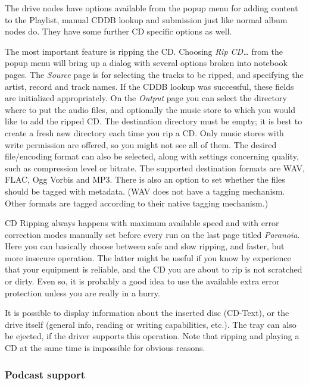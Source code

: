 \documentclass[10pt,english]{article}
\begin{document}
The drive nodes have options available from the popup
menu for adding content to the Playlist, manual CDDB lookup
and submission just like normal album nodes do. They have
some further CD specific options as well.




The most important feature is ripping the CD. Choosing
\textsl{Rip CD\dots{}} from the popup menu will bring up a
dialog with several options broken into notebook pages. The
\textsl{Source} page is for selecting the tracks to be
ripped, and specifying the artist, record and track
names. If the CDDB lookup was successful, these fields are
initialized appropriately. On the \textsl{Output} page you
can select the directory where to put the audio files, and
optionally the music store to which you would like to add
the ripped CD. The destination directory must be empty; it
is best to create a fresh new directory each time you rip a
CD. Only music stores with write permission are offered, so
you might not see all of them. The desired file/encoding
format can also be selected, along with settings concerning
quality, such as compression level or bitrate. The supported
destination formats are WAV, FLAC, Ogg Vorbis and MP3. There
is also an option to set whether the files should be tagged
with metadata. (WAV does not have a tagging mechanism. Other
formats are tagged according to their native tagging
mechanism.)




CD Ripping always happens with maximum available speed
and with error correction modes manually set before every
run on the last page titled \textsl{Paranoia}. Here you
can basically choose between safe and slow ripping, and
faster, but more insecure operation. The latter might be
useful if you know by experience that your equipment is
reliable, and the CD you are about to rip is not scratched
or dirty. Even so, it is probably a good idea to use the
available extra error protection unless you are really in a
hurry.




It is possible to display information about the inserted
disc (CD-Text), or the drive itself (general info, reading
or writing capabilities, etc.). The tray can also be
ejected, if the driver supports this operation. Note that
ripping and playing a CD at the same time is impossible for
obvious reasons.




\subsubsection{Podcast support\label{idp599120}}
\end{document}
